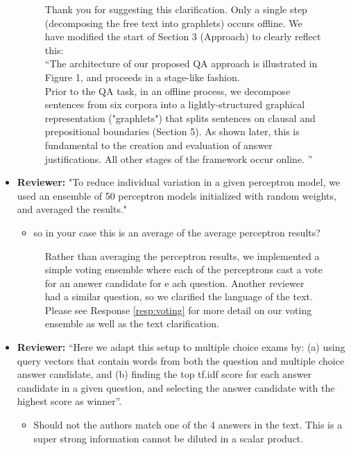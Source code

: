\documentclass[10pt]{article}
\begin{document}
\begin{itemize}
\begin{figure}[H]
\caption{ Thank you for suggesting this clarification.  Only a single step (decomposing the free text into graphlets) occurs offline.  We have modified the start of Section 3 (Approach) to clearly reflect this: ~\\
``The architecture of our proposed QA approach is illustrated in Figure 1, and proceeds in a stage-like fashion.  ~\\
Prior to the QA task, in an offline process, we decompose sentences from six corpora into a lightly-structured graphical representation ("graphlets") that splits sentences on clausal and prepositional boundaries (Section 5). As shown later, this is fundamental to the creation and evaluation of answer justifications.  All other stages of the framework occur online. ''
 }
\end{figure}


\item \textbf{Reviewer:} "To reduce individual variation in a given perceptron model, we used an
ensemble of 50 perceptron models initialized with random weights, and
averaged the results."
\begin{itemize}
\item so in your case this is an average of the average perceptron results?
\end{itemize}

\begin{figure}[H]
\caption{Rather than averaging the perceptron results, we implemented a simple voting ensemble where each of the perceptrons cast a vote for an answer candidate for e	ach question.  Another reviewer had a similar question, so we clarified the language of the text.  Please see Response \ref{resp:voting} for more detail on our voting ensemble as well as the text clarification.}
\end{figure}

\item \textbf{Reviewer:} ``Here we adapt this setup to multiple choice exams by: (a) using query
vectors that contain words from both the question and multiple choice answer
candidate, and (b) finding the top tf.idf score for each answer candidate in
a given question, and selecting the answer candidate with the highest score
as winner''.

\begin{itemize}
\item Should not the authors match one of the 4 answers in the text.
This is a super strong information cannot be diluted in a scalar product.
\end{itemize}


\end{itemize}
\end{document}

